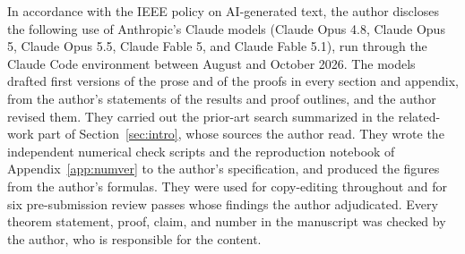 \documentclass[11pt,onecolumn]{IEEEtran}
\begin{document}
In accordance with the IEEE policy on AI-generated text, the author
discloses the following use of Anthropic's Claude models (Claude Opus
4.8, Claude Opus 5, Claude Opus 5.5, Claude Fable 5, and Claude Fable
5.1), run through
the Claude Code environment between August and October 2026. The
models drafted first versions of the prose and of the proofs in every
section and appendix, from the author's statements of the results and
proof outlines, and the author revised them. They carried out the
prior-art search summarized in the related-work part of
Section~\ref{sec:intro}, whose sources the author read. They wrote the
independent numerical check scripts and the reproduction notebook of
Appendix~\ref{app:numver} to the author's specification, and produced
the figures from the author's formulas. They were used for
copy-editing throughout and for six pre-submission review passes whose
findings the author adjudicated. Every theorem statement, proof, claim,
and number in the manuscript was checked by the author, who is
responsible for the content.
\end{document}

